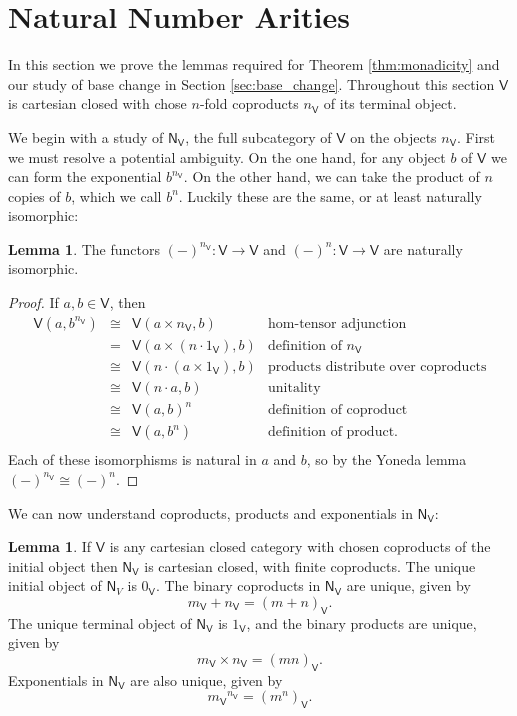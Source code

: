 \documentclass{amsart}
\theoremstyle{definition}
\newtheorem{lemma}[theorem]{Lemma}
\newcommand{\NN}{\mathsf{N}}
\newcommand{\V}{\mathsf{V}}
\newcommand{\maps}{\colon}
\begin{document}
\section{Natural Number Arities}
\label{sec:arities}

In this section we prove the lemmas required for Theorem \ref{thm:monadicity} and
our study of base change in Section \ref{sec:base_change}.  Throughout this section $\V$ is cartesian closed with chose $n$-fold coproducts $n_\V$ of its terminal object. 

We begin with a study of $\NN_\V$, the full subcategory of $\V$ on the objects $n_\V$.
First we must resolve a potential ambiguity.  On the one hand,
for any object $b$ of $\V$ we can form the exponential $b^{n_\V}$.   On the 
other hand, we can take the product of $n$ copies of $b$, which we call $b^n$.    
Luckily these are the same, or at least naturally isomorphic:

\begin{lemma}
\label{lem:powers_1}
The functors $(-)^{n_\V} \maps \V\to \V$ and $(-)^n\maps \V\to \V$ are naturally isomorphic.  
\end{lemma}
\begin{proof}
If $a,b \in \V$, then
\[\begin{array}{rcll}
	\V(a,b^{n_\V}) & \cong & \V(a\times n_\V,b) & \text{hom-tensor adjunction}\\
	& = & \V(a\times (n \cdot 1_\V),b) & \text{definition of } n_\V\\ 
	& \cong & \V(n \cdot( a\times 1_\V), b) & \text{products distribute over coproducts}\\  
	& \cong & \V(n \cdot a,b) & \text{unitality}\\  
	& \cong & \V(a,b)^n & \text{definition of coproduct}\\
	& \cong & \V(a,b^n) & \text{definition of product}.\\
	\end{array}
\]
Each of these isomorphisms is natural in $a$ and $b$, so by the Yoneda lemma $(-)^{n_\V} \cong (-)^n$.
\end{proof}

We can now understand coproducts, products and exponentials in $\NN_\V$:

\begin{lemma}
\label{lem:NN}
If $\V$ is any cartesian closed category with chosen coproducts of the initial object then
$\NN_\V$ is cartesian closed, with finite coproducts.  The unique initial object of $\NN_V$
is $0_\V$.  The binary coproducts in $\NN_\V$ are unique, given by
\[     m_\V + n_\V = (m + n)_\V . \]
The unique terminal object of $\NN_\V$ is $1_\V$, and the binary products are unique, given by
\[      m_\V \times n_\V = (mn)_\V  .\]
Exponentials in $\NN_\V$ are also unique, given by 
\[     {m_\V}^{n_\V} = (m^n)_\V   .\]
\end{lemma}
\end{document}
